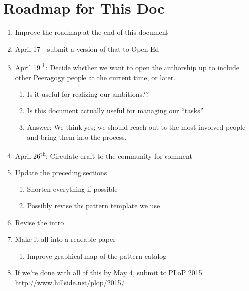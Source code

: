 \section{Roadmap for This Doc}

\begin{enumerate}
\item Improve the roadmap at the end of this document
\item April 17 - submit a version of that to Open Ed
\item April 19\textsuperscript{th}: Decide whether we want to open the authorship up to include other Peeragogy people at the current time, or later. 
\begin{enumerate}
\item Is it useful for realizing our ambitions??
\item Is this document actually useful for managing our ``tasks''
\item Answer: We think yes; we should reach out to the most involved people and bring them into the process.
\end{enumerate}
\item April 26\textsuperscript{th}: Circulate draft to the community for comment
\item Update the preceding sections
\begin{enumerate}
\item Shorten everything if possible
\item Possibly revise the pattern template we use
\end{enumerate}
\item Revise the intro
\item Make it all into a readable paper
\begin{enumerate}
\item Improve graphical map of the pattern catalog
\end{enumerate}
\item If we're done with all of this by May 4, submit to PLoP 2015 http://www.hillside.net/plop/2015/
\end{enumerate}